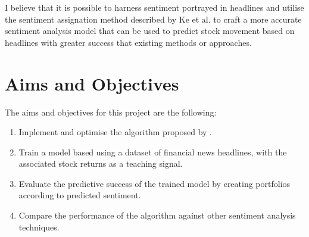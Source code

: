 I believe that it is possible to harness sentiment portrayed in headlines and utilise the sentiment assignation method described by Ke et al. to craft a more accurate sentiment analysis model that can be used to predict stock movement based on headlines with greater success that existing methods or approaches.

\section{Aims and Objectives}
The aims and objectives for this project are the following:
\begin{enumerate}
\item Implement and optimise the algorithm proposed by \cite{sestm}.
\item Train a model based using a dataset of financial news headlines, with the associated stock returns as a teaching signal.
\item Evaluate the predictive success of the trained model by creating portfolios according to predicted sentiment.
\item Compare the performance of the algorithm against other sentiment analysis techniques.
\end{enumerate}



 
